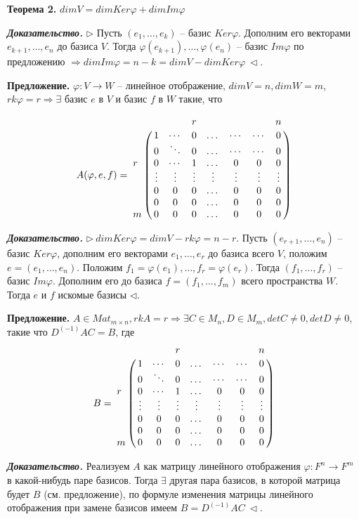 \bigskip
\textbf{Теорема 2.} $dimV = dim Ker \varphi + dim Im \varphi$

\bigskip
\textbf{\textit{Доказательство.}} $\rhd$ Пусть $(e_1, \dots, e_k)$ -- базис $Ker \varphi$. Дополним его векторами $e_{k+1}, \dots, e_n$ до базиса $V$. Тогда $\varphi(e_{k+1}), \dots, \varphi(e_n)$ -- базис $Im \varphi$ по предложению $\Rightarrow dim Im \varphi = n - k = dim V - dim Ker \varphi \ \lhd$.

\bigskip
\textbf{Предложение.} $\varphi: V \rightarrow W$ -- линейное отображение, $dim V = n, dim W = m$, $rk \varphi = r \Rightarrow \exists$ базис $e$ в $V$ и базис $f$ в $W$ такие, что 

\begin{equation*} A(\varphi, e, f) = \bordermatrix{ 
    	 & & & r & & & & n \cr
    	 & 1 & \cdots & 0 & \dots & \cdots & \cdots & 0 \cr 
         & 0 & \ddots & 0 & \dots & \cdots & \cdots & 0 \cr
		r & 0 & \cdots & 1 & \dots & 0 & 0 & 0  \cr
         & \vdots & \vdots & \vdots & \vdots & \vdots & \vdots & \vdots \cr
        & 0 & 0 & 0 & \dots & 0 & 0 & 0  \cr
        & 0 & 0 & 0 & \dots & 0 & 0 & 0  \cr
       m & 0 & 0 & 0 & \dots  & 0 & 0 & 0 }
\end{equation*}

\bigskip
\textbf{\textit{Доказательство.}} $\rhd \ dimKer \varphi = dim V - rk \varphi = n - r$. Пусть $(e_{r+1}, \dots, e_n)$ -- базис $Ker \varphi$, дополним его векторами $e_1, \dots, e_r$  до базиса всего $V$, положим $e = (e_1, \dots, e_n)$. Положим $f_1 = \varphi(e_1), \dots, f_r = \varphi(e_r)$. Тогда $(f_1, \dots, f_r)$ -- базис $Im \varphi$. Дополним его до базиса $f = (f_1, \dots, f_m)$ всего пространства $W$. Тогда $e$ и $f$ искомые базисы $\lhd$.

\bigskip
\textbf{Предложение.} $A \in Mat_{m \times n}, rkA = r \Rightarrow \exists C \in M_n, D \in M_m, detC \neq 0, detD \neq 0$, такие что $D^{(-1)} A C = B$, где 
\begin{equation*} B = \bordermatrix{ 
    	 & & & r & & & & n \cr
    	 & 1 & \cdots & 0 & \dots & \cdots & \cdots & 0 \cr 
         & 0 & \ddots & 0 & \dots & \cdots & \cdots & 0 \cr
		r & 0 & \cdots & 1 & \dots & 0 & 0 & 0  \cr
         & \vdots & \vdots & \vdots & \vdots & \vdots & \vdots & \vdots \cr
        & 0 & 0 & 0 & \dots & 0 & 0 & 0  \cr
        & 0 & 0 & 0 & \dots & 0 & 0 & 0  \cr
       m & 0 & 0 & 0 & \dots  & 0 & 0 & 0 }
\end{equation*}

\bigskip
\textbf{\textit{Доказательство.}} Реализуем $A$ как матрицу линейного отображения $\varphi : F^n \rightarrow F^m$ в какой-нибудь паре базисов. Тогда $\exists$ другая пара базисов, в которой матрица будет $B$ (см. предложение), по формуле изменения матрицы линейного отображения при замене базисов имеем $B = D^{(-1)} A C \ \lhd$.

